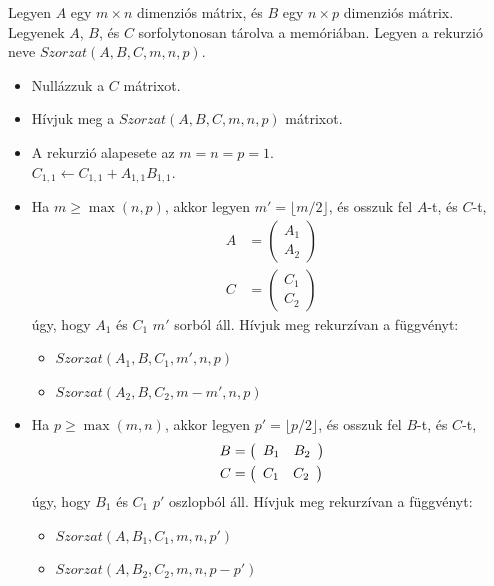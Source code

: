 \documentclass[12pt]{report}
\begin{document}
Legyen $A$ egy $m \times n$ dimenziós mátrix,
és $B$ egy $n \times p$ dimenziós mátrix.
Legyenek $A$, $B$, és $C$ sorfolytonosan tárolva a memóriában.
Legyen a rekurzió neve $Szorzat(A, B, C, m, n, p)$.
\begin{itemize}
\item Nullázzuk a $C$ mátrixot.

\item Hívjuk meg a $Szorzat(A, B, C, m, n, p)$ mátrixot.

\item A rekurzió alapesete az $m=n=p=1$. \\
$C_{1,1} \leftarrow C_{1,1} + A_{1,1} B_{1,1}$.

\item Ha $m \ge \max(n, p)$,
akkor legyen $m'=\lfloor m/2 \rfloor$,
és osszuk fel $A$-t, és $C$-t,
\begin{align*}
A&=\left(
\begin{array}{c}  
A_{1} \\
A_{2}
\end{array}
\right) \\
C&=\left(
\begin{array}{c}  
C_{1} \\
C_{2}
\end{array}
\right)
\end{align*}
úgy, hogy $A_1$ és $C_1$ $m'$ sorból áll.
Hívjuk meg rekurzívan a függvényt:
\begin{itemize}
\item $Szorzat(A_1, B, C_1, m', n, p)$
\item $Szorzat(A_2, B, C_2, m-m', n, p)$
\end{itemize}

\item Ha $p \ge \max(m, n)$,
akkor legyen $p'=\lfloor p/2 \rfloor$,
és osszuk fel $B$-t, és $C$-t,
\begin{align*}
B&=\left(
\begin{array}{c c}  
B_{1} & B_{2}
\end{array}
\right) \\
C&=\left(
\begin{array}{c c}  
C_{1} & C_{2}
\end{array}
\right)
\end{align*}
úgy, hogy $B_1$ és $C_1$ $p'$ oszlopból áll.
Hívjuk meg rekurzívan a függvényt:
\begin{itemize}
\item $Szorzat(A, B_1, C_1, m, n, p')$
\item $Szorzat(A, B_2, C_2, m, n, p-p')$
\end{itemize}


\end{itemize}
\end{document}
